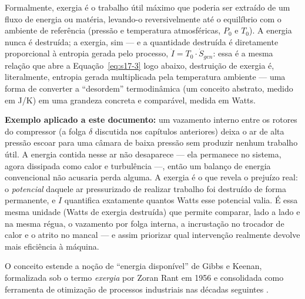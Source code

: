 \documentclass[12pt,a4paper]{article}
\numberwithin{equation}{section}
\numberwithin{table}{section}
\numberwithin{figure}{section}
\begin{document}
{Formalmente, exergia é o trabalho útil máximo que poderia ser extraído de um fluxo de energia ou matéria, levando-o reversivelmente até o equilíbrio com o ambiente de referência (pressão e temperatura atmosféricas, $P_0$ e $T_0$). A energia nunca é destruída; a exergia, sim — e a quantidade destruída é diretamente proporcional à entropia gerada pelo processo, $\dot{I} = T_0 \cdot \dot{S}_{gen}$: essa é a mesma relação que abre a Equação~\eqref{eq:s17-3} logo abaixo, destruição de exergia é, literalmente, entropia gerada multiplicada pela temperatura ambiente — uma forma de converter a ``desordem'' termodinâmica (um conceito abstrato, medido em J/K) em uma grandeza concreta e comparável, medida em Watts.

\textbf{Exemplo aplicado a este documento:} um vazamento interno entre os rotores do compressor (a folga $\delta$ discutida nos capítulos anteriores) deixa o ar de alta pressão escoar para uma câmara de baixa pressão sem produzir nenhum trabalho útil. A energia contida nesse ar não desaparece — ela permanece no sistema, agora dissipada como calor e turbulência —, então um balanço de energia convencional não acusaria perda alguma. A exergia é o que revela o prejuízo real: o \textit{potencial} daquele ar pressurizado de realizar trabalho foi destruído de forma permanente, e $\dot{I}$ quantifica exatamente quantos Watts esse potencial valia. É essa mesma unidade (Watts de exergia destruída) que permite comparar, lado a lado e na mesma régua, o vazamento por folga interna, a incrustação no trocador de calor e o atrito no mancal — e assim priorizar qual intervenção realmente devolve mais eficiência à máquina.

O conceito estende a noção de ``energia disponível'' de Gibbs e Keenan, formalizada sob o termo \textit{exergia} por Zoran Rant em 1956 e consolidada como ferramenta de otimização de processos industriais nas décadas seguintes \cite{bejan}.

}
\end{document}
